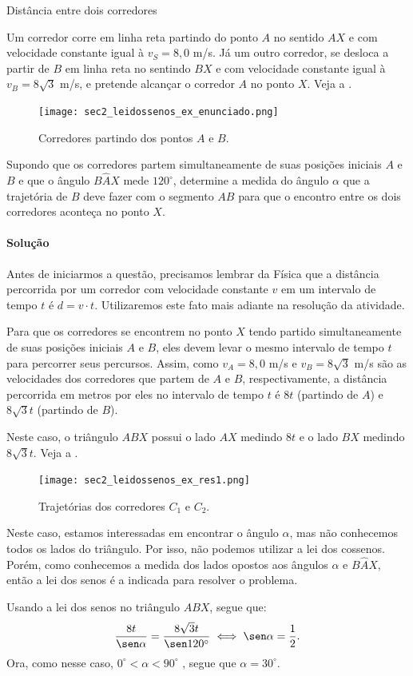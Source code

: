 \begin{example}{Distância entre dois corredores} \label{sec2_leidossenos_exemplo}

Um corredor corre em linha reta partindo do ponto $A$ no sentido $AX$ e com velocidade constante igual à $v_S= 8,0$ m/s. Já um outro corredor, se desloca a partir de $B$ em linha reta no sentindo $BX$ e com velocidade constante igual à $v_B=8\sqrt{3}$ m/s, e pretende alcançar o corredor $A$ no ponto $X$. Veja a .
\begin{figure}[H]
    \centering
    \texttt{[image: sec2\_leidossenos\_ex\_enunciado.png]}
    \caption{Corredores partindo dos pontos $A$ e $B$.}
    \label{sec2_leidossenos_ex_enunciado}
\end{figure}

Supondo que os corredores partem simultaneamente de suas posições iniciais $A$ e $B$ e que o ângulo $B\hat{A}X$ mede $120^\circ$, determine a medida do ângulo $\alpha$ que a trajetória de $B$ deve fazer com o segmento $AB$ para que o encontro entre os dois corredores aconteça no ponto $X$.

\paragraph{Solução}
\label{sec2_leidossenos_exemplo_res}
 Antes de iniciarmos a questão, precisamos lembrar da Física que a distância percorrida por um corredor com velocidade constante $v$ em um intervalo de tempo $t$ é $d=v\cdot t$. Utilizaremos este fato mais adiante na resolução da atividade.
 
 Para que os corredores se encontrem no ponto $X$ tendo partido simultaneamente de suas posições iniciais $A$ e $B$, eles devem levar o mesmo intervalo de tempo $t$ para percorrer seus percursos. Assim, como $v_A= 8,0$ m/s e $v_B=8\sqrt{3}$ m/s são as velocidades dos corredores que partem de $A$ e $B$, respectivamente, a distância percorrida em metros por eles no intervalo de tempo $t$ é $8t$ (partindo de $A$) e $8\sqrt{3}t$ (partindo de $B$). 
 
 Neste caso, o triângulo $ABX$ possui o lado $AX$ medindo $8t$ e o lado $BX$ medindo $8\sqrt{3}t$. Veja a .
  \begin{figure}[H]
    \centering
    \texttt{[image: sec2\_leidossenos\_ex\_res1.png]}
    \caption{Trajetórias dos corredores $C_1$ e $C_2$.}
    \label{sec2_leidossenos_ex_resolucao}
\end{figure}

Neste caso, estamos interessadas em encontrar o ângulo $\alpha$, mas não conhecemos todos os lados do triângulo. Por isso, não podemos utilizar a lei dos cossenos. Porém, como conhecemos a medida dos lados opostos aos ângulos $\alpha$ e $B\hat{A}X$, então a lei dos senos é a indicada para resolver o problema.
    
    Usando a lei dos senos no triângulo $ABX$, segue que:
    $$\frac{8t}{\sen\alpha}=\frac{8\sqrt{3}t}{\sen120^\circ}\iff \sen\alpha=\frac{1}{2}.$$ 
    Ora, como nesse caso, $0^\circ < \alpha < 90^\circ$ , segue que $\alpha=30^\circ$.
\end{example}

